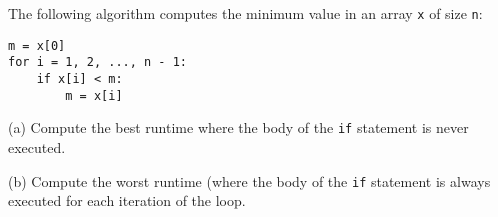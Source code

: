 The following algorithm
computes the minimum value in an array \verb!x! of size \verb!n!:
\begin{Verbatim}[frame=single, fontsize=\footnotesize]
m = x[0]
for i = 1, 2, ..., n - 1:
    if x[i] < m:
        m = x[i]
\end{Verbatim}
(a) Compute the best runtime where the body of the \verb!if! statement
    is never executed.

(b) Compute the worst runtime (where the body of the \verb!if! statement
    is always executed for each iteration of the loop.
